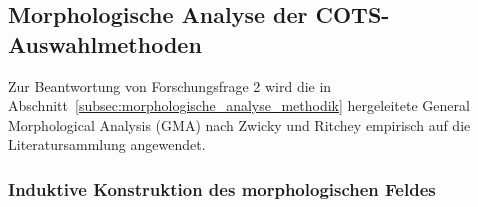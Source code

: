 \subsection{Morphologische Analyse der COTS-Auswahlmethoden}
\label{subsec:morphologische_analyse_ergebnisse}

Zur Beantwortung von Forschungsfrage 2 wird die in Abschnitt~\ref{subsec:morphologische_analyse_methodik} hergeleitete General Morphological Analysis (GMA) nach Zwicky und Ritchey \parencite[S.~81 bis 91]{Z6N6V5L9} empirisch auf die Literatursammlung angewendet.

\subsubsection{Induktive Konstruktion des morphologischen Feldes}
\label{subsubsec:feldkonstruktion}

